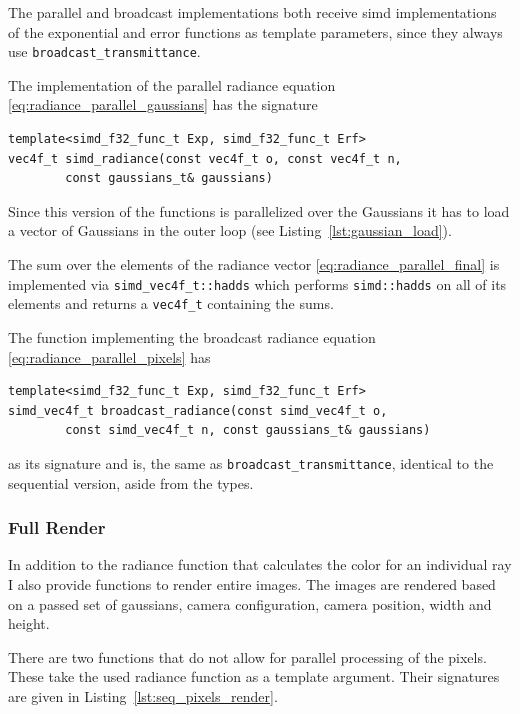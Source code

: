 \documentclass[a4paper, 11pt]{memoir}
\begin{document}
    The parallel and broadcast implementations both receive \gls{simd} implementations of the exponential and error
    functions as template parameters, since they always use \texttt{broadcast_transmittance}.

    The implementation of the parallel \gls{radiance} equation \eqref{eq:radiance_parallel_gaussians} has the signature
    \begin{verbatim}
template<simd_f32_func_t Exp, simd_f32_func_t Erf>
vec4f_t simd_radiance(const vec4f_t o, const vec4f_t n,
        const gaussians_t& gaussians)
    \end{verbatim}
    
    Since this version of the functions is parallelized over the Gaussians it has to load a vector of Gaussians in the
    outer loop (see Listing~\ref{lst:gaussian_load}).

    The sum over the elements of the \gls{radiance} vector \eqref{eq:radiance_parallel_final} is implemented via
    \texttt{simd_vec4f_t::hadds} which performs \texttt{simd::hadds} on all of its elements and returns
    a \texttt{vec4f_t} containing the sums.

    The function implementing the broadcast \gls{radiance} equation \eqref{eq:radiance_parallel_pixels} has
    \begin{verbatim}
template<simd_f32_func_t Exp, simd_f32_func_t Erf>
simd_vec4f_t broadcast_radiance(const simd_vec4f_t o,
        const simd_vec4f_t n, const gaussians_t& gaussians)
    \end{verbatim}
    as its signature and is, the same as \texttt{broadcast_transmittance}, identical to the sequential version,
    aside from the types.
    
    \subsubsection{Full Render}
    In addition to the radiance function that calculates the color for an individual ray I also provide functions to
    render entire images. The images are rendered based on a passed set of gaussians, camera configuration, camera position,
    width and height.

    There are two functions that do not allow for parallel processing of the pixels. These take the used \gls{radiance}
    function as a template argument. Their signatures are given in Listing~\ref{lst:seq_pixels_render}.
\end{document}
